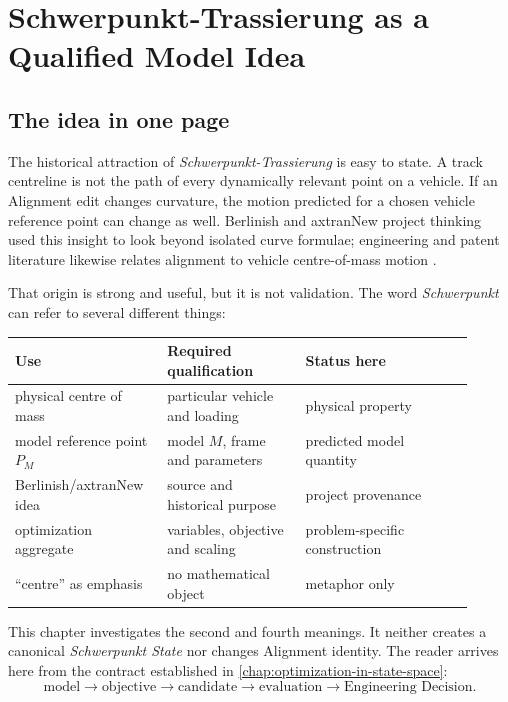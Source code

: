 \chapter{Schwerpunkt-Trassierung as a Qualified Model Idea}

\section*{The idea in one page}

The historical attraction of \emph{Schwerpunkt-Trassierung} is easy to state.
A track centreline is not the path of every dynamically relevant point on a
vehicle. If an Alignment edit changes curvature, the motion predicted for a
chosen vehicle reference point can change as well. Berlinish and axtranNew
project thinking used this insight to look beyond isolated curve formulae;
engineering and patent literature likewise relates alignment to vehicle
centre-of-mass motion \cite{Hasslinger2002Schwerpunkt}.

That origin is strong and useful, but it is not validation. The word
\emph{Schwerpunkt} can refer to several different things:

\begin{center}
\small
\begin{tabular}{p{0.29\linewidth}p{0.28\linewidth}p{0.34\linewidth}}
\toprule
Use & Required qualification & Status here\\
\midrule
physical centre of mass & particular vehicle and loading & physical property\\
model reference point \(P_M\) & model \(M\), frame and parameters & predicted model quantity\\
Berlinish/axtranNew idea & source and historical purpose & project provenance\\
optimization aggregate & variables, objective and scaling & problem-specific construction\\
``centre'' as emphasis & no mathematical object & metaphor only\\
\bottomrule
\end{tabular}
\end{center}

This chapter investigates the second and fourth meanings. It neither creates a
canonical \emph{Schwerpunkt State} nor changes Alignment identity. The reader
arrives here from the contract established in
\cref{chap:optimization-in-state-space}:
\[
\text{model}\to\text{objective}\to\text{candidate}
\to\text{evaluation}\to\text{Engineering Decision}.
\]

